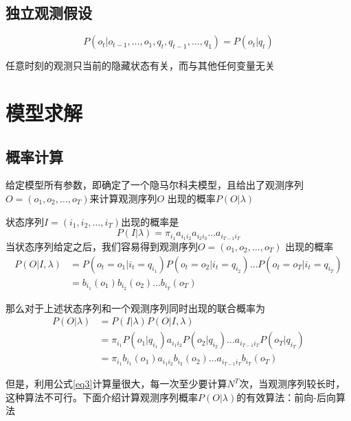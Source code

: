 \documentclass[a4paper,12pt]{ctexart}     %
\begin{document}
	\subsection{独立观测假设}	
	
	\begin{equation}\label{eq2}
	P(o_t|o_{t-1},\dots,o_1,q_t,q_{t-1},\dots,q_1) = P(o_t|q_t)
	\end{equation}


	任意时刻的观测只当前的隐藏状态有关，而与其他任何变量无关
	
	\section{模型求解}
	
		\subsection{概率计算}
		
		给定模型所有参数，即确定了一个隐马尔科夫模型，且给出了观测序列$ O = (o_1,o_2,\dots,o_T) $来计算观测序列$ O $ 出现的概率$ P(O|\lambda) $  
		
		状态序列$ I=(i_1,i_2,\dots,i_T) $出现的概率是
		\begin{equation}
			P(I|\lambda) = \pi_{i_1}a_{i_1i_2}a_{i_2i_3}\dots a_{i_{T-1}i_T}
		\end{equation}
		当状态序列给定之后，我们容易得到观测序列$ O=(o_1,o_2,\dots,o_T) $ 出现的概率
		\begin{equation}
			\begin{split}
				P(O|I,\lambda) &= P(o_t=o_1|i_t=q_{i_1})P(o_t=o_2|i_t=q_{i_2})\dots P(o_t=o_T|i_t=q_{i_T}) \\
				&= b_{i_1}(o_1)b_{i_2}(o_2)\dots b_{i_T}(o_T)
			\end{split}
		\end{equation}
	
	那么对于上述状态序列和一个观测序列同时出现的联合概率为
	\begin{equation} \label{eq3}
		\begin{split}
			P(O|\lambda) &= P(I|\lambda)P(O|I,\lambda)\\
			&= \pi_{i_1}P(o_1|q_{i_1})a_{i_1i_2}P(o_2|q_{i_2})\dots a_{i_{T-1}i_T}P(o_T|q_{i_T})\\
			&= \pi_{i_1}b_{i_1}(o_1)a_{i_1i_2}b_{i_2}(o_2)\dots a_{i_{T-1}i_T}b_{i_T}(o_T)
		\end{split}
	\end{equation}

	但是，利用公式\ref{eq3}计算量很大，每一次至少要计算$ N^T $次，当观测序列较长时，这种算法不可行。下面介绍计算观测序列概率$ P(O|\lambda) $的有效算法：前向-后向算法
\end{document}
